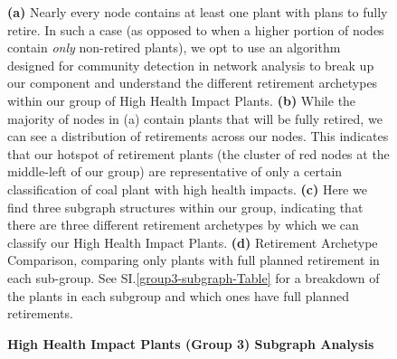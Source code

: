 \begin{figure}[H]
    \caption{\textbf{High Health Impact Plants (Group 3) Subgraph Analysis}}
    \medskip
    \footnotesize
    \textbf{(a)} Nearly every node contains at least one plant with plans to fully retire. In such a case (as opposed to when a higher portion of nodes contain \textit{only} non-retired plants),
    we opt to use an algorithm designed for community detection in network analysis to break up our component and understand the different retirement archetypes within
    our group of High Health Impact Plants.
    \textbf{(b)} While the majority of nodes in (a) contain plants that will be fully retired, we can see a distribution of retirements across our nodes. This indicates that our hotspot of retirement plants (the cluster of red nodes at the middle-left of our group) 
    are representative of only a certain classification of coal plant with high health impacts.
    \textbf{(c)} Here we find three subgraph structures within our group, indicating that 
    there are three different retirement archetypes by which we can classify our High Health Impact Plants.
    \textbf{(d)} Retirement Archetype Comparison, comparing only plants with full planned retirement in each sub-group. See SI.\ref{group3-subgraph-Table} for a breakdown of the plants in each subgroup and which ones have full planned retirements.
\end{figure}



